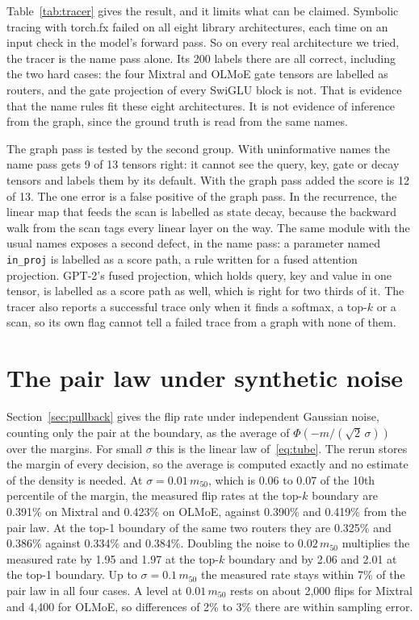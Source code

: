 \documentclass[10pt]{article}
\begin{document}
Table~\ref{tab:tracer} gives the result, and it limits what can be claimed. Symbolic tracing with
torch.fx failed on all eight library architectures, each time on an input check in the model's
forward pass. So on every real architecture we tried, the tracer is the name pass alone. Its 200
labels there are all correct, including the two hard cases: the four Mixtral and OLMoE gate tensors
are labelled as routers, and the gate projection of every SwiGLU block is not. That is evidence
that the name rules fit these eight architectures. It is not evidence of inference from the
graph, since the ground truth is read from the same names.

The graph pass is tested by the second group. With uninformative names the name pass gets 9 of 13
tensors right: it cannot see the query, key, gate or decay tensors and labels them by its
default. With the graph pass added the score is 12 of 13. The one error is a false positive of
the graph pass. In the recurrence, the linear map that feeds the scan is labelled as state decay,
because the backward walk from the scan tags every linear layer on the way. The same module with
the usual names exposes a second defect, in the name pass: a parameter named \texttt{in\_proj} is
labelled as a score path, a rule written for a fused attention projection. GPT-2's fused
projection, which holds query, key and value in one tensor, is labelled as a score path as well,
which is right for two thirds of it. The tracer also reports a successful trace only when it
finds a softmax, a top-$k$ or a scan, so its own flag cannot tell a failed trace from a graph
with none of them.

\section{The pair law under synthetic noise}\label{app:law}

Section~\ref{sec:pullback} gives the flip rate under independent
Gaussian noise, counting only the pair at the boundary, as the average of
$\Phi(-m/(\sqrt2\,\sigma))$ over the margins. For small $\sigma$ this is the linear law
of~\eqref{eq:tube}. The rerun stores the margin of every decision, so the average is computed
exactly and no estimate of the density is needed. At $\sigma = 0.01\,m_{50}$, which is 0.06 to
0.07 of the 10th percentile of the margin, the measured flip rates at the top-$k$ boundary are
0.391\% on Mixtral and 0.423\% on OLMoE, against 0.390\% and 0.419\% from the pair law. At the
top-1 boundary of the same two routers they are 0.325\% and 0.386\% against 0.334\% and 0.384\%.
Doubling the noise to $0.02\,m_{50}$ multiplies the measured rate by 1.95 and 1.97 at the
top-$k$ boundary and by 2.06 and 2.01 at the top-1 boundary. Up to $\sigma = 0.1\,m_{50}$ the
measured rate stays within 7\% of the pair law in all four cases. A level at
$0.01\,m_{50}$ rests on about 2{,}000 flips for Mixtral and 4{,}400 for OLMoE, so differences of
2\% to 3\% there are within sampling error.
\end{document}
